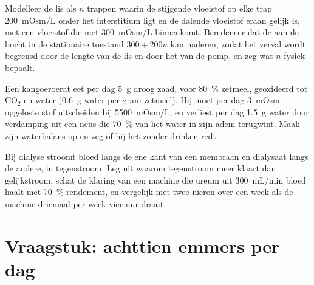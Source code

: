 \begin{exercise}[$\star\star\star$]\label{exo:b3:renal-osmoregulation:10}
Modelleer de lis als $n$ trappen waarin de stijgende vloeistof op elke
trap \qty{200}{mOsm/L} onder het interstitium ligt en de dalende
vloeistof eraan gelijk is, met een vloeistof die met \qty{300}{mOsm/L}
binnenkomt. Beredeneer dat de  aan de bocht in de
stationaire toestand $300 +
200n$ kan naderen, zodat het verval wordt begrensd door de lengte van
de lis en door het  van de pomp, en zeg wat $n$
fysiek bepaalt.
\end{exercise}

\begin{exercise}[$\star\star\star$]\label{exo:b3:renal-osmoregulation:11}
Een kangoeroerat eet per dag \qty{5}{g} droog zaad, voor \qty{80}{\%}
zetmeel, geoxideerd tot CO$_{2}$ en water (\qty{0.6}{g} water per gram
zetmeel). Hij moet per dag \qty{3}{mOsm} opgeloste stof uitscheiden bij
\qty{5500}{mOsm/L}, en verliest per dag \qty{1.5}{g} water door
verdamping uit een neus die \qty{70}{\%} van het water in zijn adem
terugwint. Maak zijn waterbalans op en zeg of hij het zonder drinken
redt.
\end{exercise}

\begin{exercise}[$\star\star\star$]\label{exo:b3:renal-osmoregulation:12}
Bij dialyse stroomt bloed langs de ene kant van een membraan en
dialysaat langs de andere, in tegenstroom. Leg uit waarom tegenstroom
meer klaart dan gelijkstroom, schat de klaring van een machine die
ureum uit \qty{300}{mL/min} bloed haalt met \qty{70}{\%} rendement, en
vergelijk met twee nieren over een week als de machine driemaal per
week vier uur draait.
\end{exercise}

\section{Vraagstuk: achttien emmers per dag}

